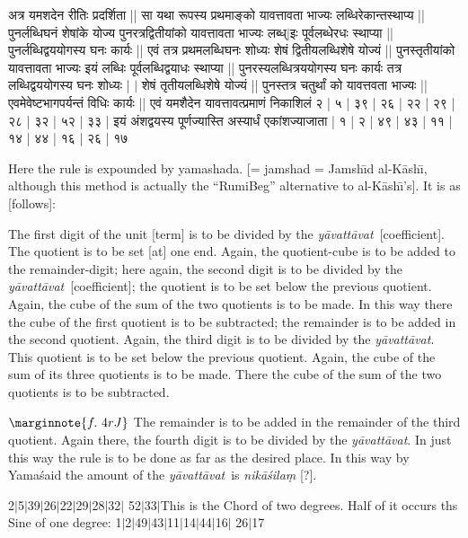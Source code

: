 \documentclass[12pt]{book}
\let\*=\d
\def\ya{\textit{y\=avat\-t\=avat}}
\def\danda{$|$}
\begin{document}
\newpage

{\s अत्र यमशदेन रीतिः प्रदर्शिता ||
सा यथा रूपस्य प्रथमाङ्को यावत्तावता भाज्यः लब्धिरेकान्तस्थाप्य || पुनर्लब्धिघनं शेषांके योज्य
पुनरत्रद्वितीयांको यावत्तावता भाज्यः लब्ध्$|$इः पूर्वलब्धेरधः स्थाप्या || पुनर्लब्धिद्वययोगस्य घनः
कार्यः || एवं तत्र प्रथमलब्धिघनः शोध्यः शेषं द्वितीयलब्धि\-शेषे योज्यं || पुनस्तृतीयांको
यावत्तावता भाज्यः इयं लब्धिः पूर्वलब्धिद्वयाधः स्थाप्या || पुनरस्यलब्धित्रययोगस्य घनः कार्यः
तत्र लब्धिद्वययोगस्य घनः शोध्यः | $|$ %
शेषं तृतीयलब्धिशेषे योज्यं || पुनस्तत्र चतुर्थां को यावत्तवता भाज्यः || एवमेवेष्टभागपर्यन्तं विधिः कार्यः ||
एवं यमशैदेन यावत्तावत्प्रमाणं निकाशिलं २ | ५ | ३९ | २६ | २२ | २९ | २८ | ३२ | ५२ | ३३ | इयं
अंशद्वयस्य पूर्णज्यास्ति अस्यार्धं एकांशज्याजाता | १ | २ | ४९ | ४३ | ११ | १४ | ४४ | १६ | २६ | १७} 

\newpage

Here the rule is expounded by yamashada. 
[= jamshad = Jamsh\={\i}d al-K\=ash\={\i}, although this method is actually
the ``RumiBeg'' alternative to al-K\=ash\={\i}'s]. It is as [follows]:

The first digit of the unit [term] is to be divided by the \ya\ [coefficient]. The quotient is to be set
[at] one end. Again, the quotient-cube is to be added to the remainder-digit;
here again, the second digit is to be divided by the \ya\ [coefficient]; the quotient is to be  set
below the previous quotient. Again, the cube of the sum of the two quotients
is to be made.  In this way there the cube of the first quotient is to be subtracted;
the remainder is to be added in the second quotient. Again, the third digit is to be
divided by the \ya. This quotient is to be set below the previous quotient. Again,
the cube of the sum of its three quotients is to be made. There the cube of
the sum of the two quotients is to be subtracted. 

$\marginnote{f.~4r J}$
The remainder is to be added in the remainder of the third quotient. Again there, the 
fourth digit is to be divided by the \ya. In just this way the rule is to be done as far
as the desired place. In this way by  Yama\'said the amount of the \ya\ is 
\textit{nik\=a\'sila\*m} [?].

2\danda 5\danda 39\danda 26\danda 22\danda 29\danda 28\danda 32\danda
52\danda 33\danda This is the Chord of two degrees. Half of it occurs ths
Sine of one degree: 
1\danda 2\danda 49\danda 43\danda 11\danda 14\danda 44\danda 16\danda
26\danda 17 

\newpage
\end{document}
